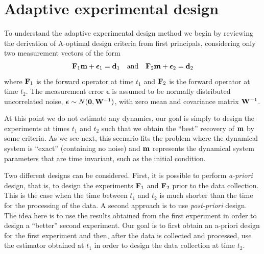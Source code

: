 \documentclass[leqno,onefignum,onetabnum]{siamltexmm}
\newcommand{\bfF}	{{\bf{F}}}
\newcommand{\bfW}	{{\bf{W}}}
\newcommand{\bfd}	{{\bf{d}}}
\newcommand{\bfm}	{{\bf{m}}}
\newcommand{\bfepsilon} {{\boldsymbol \epsilon}}
\newcommand {\zero}  {{\bf 0}}
\begin{document}
\section{ Adaptive experimental design}
\label{sec: Adaptive}To understand the adaptive experimental design method we begin by reviewing the derivation of A-optimal design criteria from first principals, considering only two measurement vectors  of the form
\begin{align}
\label{data}
\bfF_{1} \bfm + \bfepsilon_1 = \bfd_{1}\quad {\rm and} \quad \bfF_{2} \bfm + \bfepsilon_2 = \bfd_{2}
\end{align}
where $\bfF_{1}$ is the forward operator at time $t_{1}$ and $\bfF_{2}$ is the forward operator 
at time $t_{2}$. The measurement error $\bfepsilon$ is assumed to be normally distributed uncorrelated noise, $ \bfepsilon\sim N(\zero,\bfW^{-1})$, with zero mean and covariance matrix $\bfW^{-1}$. 

At this point we do not estimate any dynamics,
our goal is simply to design the experiments at times $t_{1}$ and $t_{2}$ such that we obtain the ``best''
recovery of $\bfm$ by some criteria.
As we see next, this scenario fits the problem where the dynamical system is ``exact'' (containing
no noise) and $\bfm$ represents the dynamical system parameters that are time invariant, such as the initial condition.

Two different designs can be considered. First, it is possible to perform {\em a-priori} design, that is,
to design the experiments $\bfF_{1}$ and $\bfF_{2}$ prior to the data collection. This is the case
when the time between $t_{1}$ and $t_{2}$ is much shorter than the time for the processing
of the data. A second approach is to use {\em post-priori} design. The idea here is to use the 
results obtained from the first experiment in order to design a ``better'' second experiment.
Our goal is to first obtain an a-priori design for the first experiment
and then, after the data is collected and processed, use the estimator
obtained at $t_{1}$ in order  to design the data collection
at time $t_{2}$.
\end{document}
